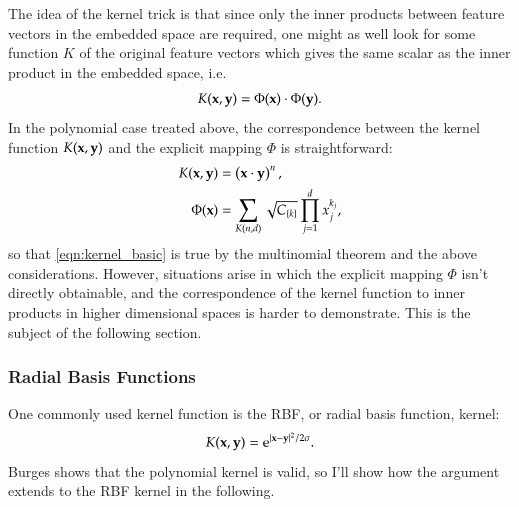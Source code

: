 The idea of the kernel trick is that since only the inner products between feature vectors in the embedded space are required, one might as well look for some function $K$ of the original feature vectors which gives the same scalar as the inner product in the embedded space, i.e.
\begin{equation}
	K(\mathbf{x}, \mathbf{y}) = \Phi(\mathbf{x}) \cdot \Phi(\mathbf{y}). \label{eqn:kernel_basic}
\end{equation}
In the polynomial case treated above, the correspondence between the kernel function $K(\mathbf{x}, \mathbf{y})$ and the explicit mapping $\Phi$ is straightforward:
\begin{align}
	K(\mathbf{x}, \mathbf{y}) &= \left( \mathbf{x} \cdot \mathbf{y} \right)^n, \\
	\Phi(\mathbf{x}) &= \sum_{K(n,d)} \sqrt{C_{\left\{ k \right\}}} \prod_{j = 1}^d x_j^{k_j},
\end{align}
so that \eqref{eqn:kernel_basic} is true by the multinomial theorem and the above considerations. However, situations arise
in which the explicit mapping $\Phi$ isn't directly obtainable, and the correspondence of the kernel function to inner products in higher dimensional spaces is harder to demonstrate. This is the subject of the following section.

\subsubsection{Radial Basis Functions}
One commonly used kernel function is the RBF, or radial basis function, kernel:
\begin{equation}
	K(\mathbf{x}, \mathbf{y}) = \mathrm{e}^{|\mathbf{x}-\mathbf{y}|^2/2\sigma}. \label{eqn:rbf_kernel}
\end{equation}
Burges \cite{burges1998} shows that the polynomial kernel is valid, so I'll show how the argument extends to the RBF kernel in the following.

